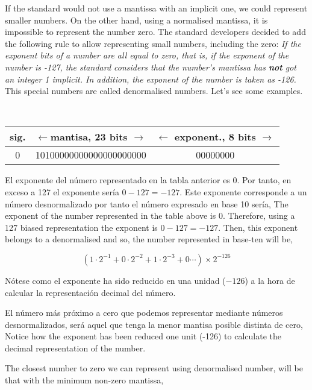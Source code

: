\begin{paracol}{2}
If the standard would not use a mantissa with an implicit one, we could represent smaller numbers. On the other hand, using a normalised mantissa, it is impossible to represent the number zero. The standard developers decided to add the following  rule to allow representing small numbers, including the zero: \emph{If the exponent bits of a number are all equal to zero, that is, if the exponent of the number is -127, the standard considers that the number's mantissa has \textbf{not} got an integer 1 implicit. In addition, the exponent of the number is taken as -126.} This special numbers are called denormalised numbers. Let's see some examples.   
\end{paracol}
\ \\
\begin{minipage}{\textwidth}
\centering
\begin{tabular}{|c||c||c|}
\hline
sig.&$\leftarrow$mantisa, 23 bits $\rightarrow$&$\leftarrow$ exponent., 8 bits $\rightarrow$\\
\hline
0&10100000000000000000000&00000000\\
\hline
\end{tabular}
\end{minipage}

\begin{paracol}{2}
El exponente del número representado en la tabla anterior es 0. Por tanto, en exceso a 127 el exponente sería $0-127=-127$. Este exponente corresponde a un número desnormalizado por tanto el número expresado en base 10 sería,
\switchcolumn
The exponent  of the number represented in the table above is 0. Therefore, using a 127 biased representation the exponent is $0-127 = -127$. Then, this exponent belongs to a denormalised and so, the number represented in base-ten will be,   
\end{paracol}
\begin{equation*}
(1\cdot 2^{-1}+ 0\cdot 2^{-2}+1\cdot2^{-3}+0\cdots)\times2^{-126}
\end{equation*}
\begin{paracol}{2}
Nótese como el exponente ha sido reducido en una unidad ($-126$) a la hora de calcular la representación decimal del número.

 El número más próximo a cero que podemos representar mediante números desnormalizados, será aquel que tenga la menor mantisa posible distinta de cero,\\ 

\switchcolumn
Notice how the exponent has been reduced one unit (-126) to calculate the decimal representation of the number.

 The closest number to zero we can represent using denormalised number, will be that with the minimum non-zero mantissa, 
\end{paracol}

